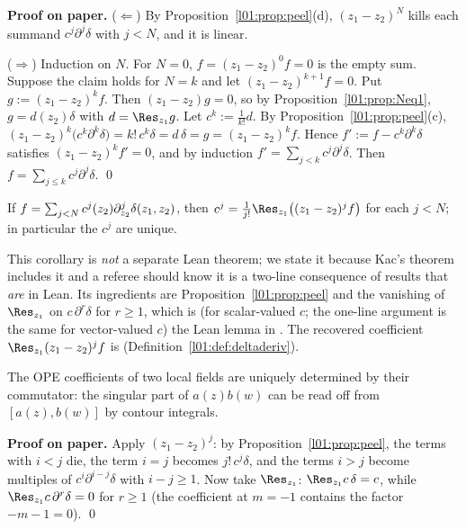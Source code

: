 \textbf{Proof on paper.} ($\Leftarrow$) By Proposition~\ref{l01:prop:peel}(d), $(z_1-z_2)^N$ kills each
summand $c^j\partial^j\delta$ with $j<N$, and it is linear.

($\Rightarrow$) Induction on $N$. For $N = 0$, $f = (z_1-z_2)^0f = 0$ is the empty sum. Suppose the claim
holds for $N = k$ and let $(z_1-z_2)^{k+1}f = 0$. Put $g := (z_1-z_2)^kf$. Then $(z_1-z_2)g = 0$, so by
Proposition~\ref{l01:prop:Neq1}, $g = d(z_2)\delta$ with $d = \Res_{z_1}g$. Let
$c^k := \frac1{k!}d$. By Proposition~\ref{l01:prop:peel}(c),
$(z_1-z_2)^k\big(c^k\partial^k\delta\big) = k!\,c^k\delta = d\,\delta = g = (z_1-z_2)^kf$. Hence
$f' := f-c^k\partial^k\delta$ satisfies $(z_1-z_2)^kf' = 0$, and by induction
$f' = \sum_{j<k}c^j\partial^j\delta$. Then $f = \sum_{j\le k}c^j\partial^j\delta$. \qed

\begin{corollary}\label{l01:cor:unique}
If $f = \sum_{j<N}c^j(z_2)\partial^j_{z_2}\delta(z_1,z_2)$, then $c^j = \frac1{j!}\Res_{z_1}\big((z_1-z_2)^jf\big)$ for
each $j<N$; in particular the $c^j$ are unique.
\end{corollary}

\begin{dictionary}
This corollary is \emph{not} a separate Lean theorem; we state it because Kac's theorem includes it and a
referee should know it is a two-line consequence of results that \emph{are} in Lean. Its ingredients are
Proposition~\ref{l01:prop:peel} and the vanishing of $\Res_{z_1}$ on $c\,\partial^{r}\delta$ for $r\ge1$, which is
(for scalar-valued $c$; the one-line argument is the same for vector-valued $c$) the Lean lemma
 in . The
recovered coefficient $\Res_{z_1}(z_1-z_2)^jf$ is  (Definition~\ref{l01:def:deltaderiv}).
\end{dictionary}

\begin{physics}
The OPE coefficients of two local fields are uniquely determined by their commutator: the singular
part of $a(z)b(w)$ can be read off from $[a(z),b(w)]$ by contour integrals.
\end{physics}

\textbf{Proof on paper.} Apply $(z_1-z_2)^j$: by Proposition~\ref{l01:prop:peel}, the terms with $i<j$ die, the
term $i = j$ becomes $j!\,c^j\delta$, and the terms $i>j$ become multiples of $c^i\partial^{i-j}\delta$ with
$i-j\ge1$. Now take $\Res_{z_1}$: $\Res_{z_1}c\,\delta = c$, while $\Res_{z_1}c\,\partial^r\delta = 0$ for $r\ge1$
(the coefficient at $m = -1$ contains the factor $-m-1 = 0$). \qed

